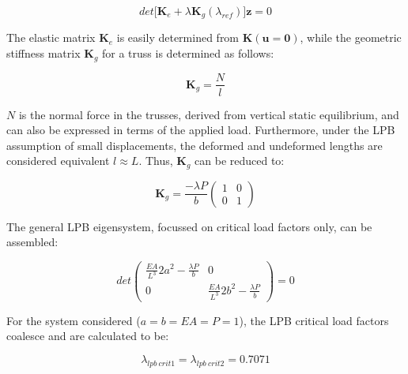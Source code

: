 \begin{equation} 
det\big[
\mathbf{K}_e +
{\lambda}
\mathbf{K}_g(\lambda_{ref})
\big]\mathbf{z} = 0
\label{eqapp0_11}
\end{equation}

The elastic matrix $\mathbf{K}_e$ is easily determined from $\mathbf{K}(\mathbf{u} = \mathbf{0})$, while the geometric stiffness matrix $\mathbf{K}_g$ for a truss is determined as follows:

 \begin{equation} 
\mathbf{K}_g = 
\frac{N}{l}
\label{eqapp0_12}
\end{equation}

$N$ is the normal force in the trusses, derived from vertical static equilibrium, and can also be expressed in terms of the applied load. Furthermore, under the LPB assumption of small displacements, the deformed and undeformed lengths are considered equivalent $l \approx L$. Thus, $\mathbf{K}_g$ can be reduced to:

 \begin{equation} 
\mathbf{K}_g = 
\frac{-\lambda P}{b}
\begin{pmatrix}
1 & 0 \\
0 & 1
\end{pmatrix}
\label{eqapp0_13}
\end{equation}

The general LPB eigensystem, focussed on critical load factors only, can be assembled:

 \begin{equation} 
 det
\begin{pmatrix}
\frac{EA}{L^3} 2a^2 - \frac{\lambda P}{b} & 0 \\
0 &  \frac{EA}{L^3} 2b^2 - \frac{\lambda P}{b}
\end{pmatrix}
= 0
\label{eqapp0_14}
\end{equation}

For the system considered ($a=b=EA=P=1$), the LPB critical load factors coalesce and are calculated to be:

\begin{equation} 
\lambda_{lpb\ crit1} = 
\lambda_{lpb\ crit2} = 0.7071
\label{eqapp0_15}
\end{equation}
